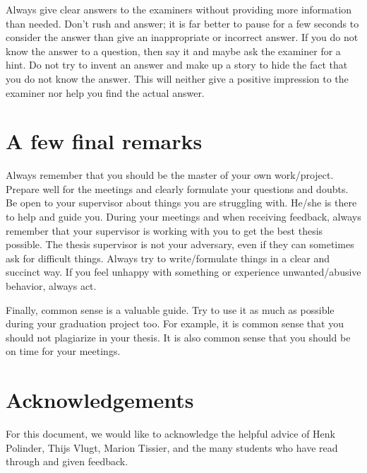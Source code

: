 \documentclass{article}
\begin{document}
Always give clear answers to the examiners without providing more information than needed. Don’t rush and answer; it is far better to pause for a few seconds to consider the answer than give an inappropriate or incorrect answer. If you do not know the answer to a question, then say it and maybe ask the examiner for a hint. Do not try to invent an answer and make up a story to hide the fact that you do not know the answer. This will neither give a positive impression to the examiner nor help you find the actual answer.  


\section{A few final remarks}
Always remember that you should be the master of your own work/project. Prepare well for the meetings and clearly formulate your questions and doubts. Be open to your supervisor about things you are struggling with. He/she is there to help and guide you. During your meetings and when receiving feedback, always remember that your supervisor is working with you to get the best thesis possible. The thesis supervisor is not your adversary, even if they can sometimes ask for difficult things. Always try to write/formulate things in a clear and succinct way. If you feel unhappy with something or experience unwanted/abusive behavior, always act.

Finally, common sense is a valuable guide. Try to use it as much as possible during your graduation project too. For example, it is common sense that you should not plagiarize in your thesis. It is also common sense that you should be on time for your meetings.

\section{Acknowledgements}
For this document, we would like to acknowledge the helpful advice of Henk Polinder, Thijs Vlugt, Marion Tissier, and the many students who have read through and given feedback.





\end{document}
